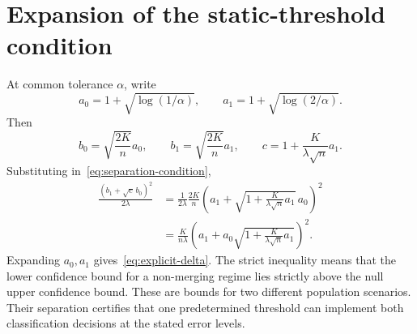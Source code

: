 \documentclass[11pt,a4paper]{article}
\theoremstyle{definition}
\theoremstyle{remark}
\begin{document}
\section{Expansion of the static-threshold condition}\label{app:threshold}
At common tolerance $\alpha$, write
\[
 a_0=1+\sqrt{\log(1/\alpha)},\qquad
 a_1=1+\sqrt{\log(2/\alpha)}.
\]
Then
\[
 b_0=\sqrt{\frac{2K}{n}}a_0,\qquad
 b_1=\sqrt{\frac{2K}{n}}a_1,\qquad
 c=1+\frac{K}{\lambda\sqrt n}a_1.
\]
Substituting in~\eqref{eq:separation-condition},
\begin{align*}
 \frac{(b_1+\sqrt c\,b_0)^2}{2\lambda}
 &=\frac1{2\lambda}\frac{2K}{n}
   \left(a_1+\sqrt{1+\frac{K}{\lambda\sqrt n}a_1}\,a_0\right)^2\\
 &=\frac{K}{n\lambda}
   \left(a_1+a_0\sqrt{1+\frac{K}{\lambda\sqrt n}a_1}\right)^2.
\end{align*}
Expanding $a_0,a_1$ gives~\eqref{eq:explicit-delta}. The strict
inequality means that the lower confidence bound for a non-merging
regime lies strictly above the null upper confidence bound. These
are bounds for two different population scenarios. Their separation
certifies that one predetermined threshold can implement both
classification decisions at the stated error levels.
\end{document}
